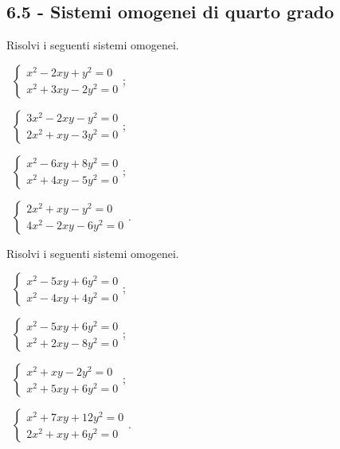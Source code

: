 \subsection*{6.5 - Sistemi omogenei di quarto grado}

\begin{esercizio}[\Ast]
 \label{ese:6.48}
Risolvi i seguenti sistemi omogenei.
\begin{multicols}{2}
 \begin{enumeratea}
 \item~$\left\{\begin{array}{l}x^2-2xy+y^2=0\\x^2+3xy-2y^2=0\end{array}\right.$;
 \item~$\left\{\begin{array}{l}3x^2-2xy-y^2=0\\2x^2+xy-3y^2=0\end{array}\right.$;
 \item~$\left\{\begin{array}{l}x^2-6{xy}+8y^2=0 \\x^2+4{xy}-5y^2=0 \end{array}\right.$;
 \item~$\left\{\begin{array}{l}2x^2+xy-y^2=0\\4x^2-2xy-6y^2=0\end{array}\right.$.
 \end{enumeratea}
\end{multicols}
\end{esercizio}

\begin{esercizio}[\Ast]
\label{ese:6.49}
Risolvi i seguenti sistemi omogenei.
\begin{multicols}{2}
 \begin{enumeratea}
 \item~$\left\{\begin{array}{l}x^2-5xy+6y^2=0\\x^2-4xy+4y^2=0\end{array}\right.$;
 \item~$\left\{\begin{array}{l}x^2-5xy+6y^2=0\\x^2+2xy-8y^2=0\end{array}\right.$;
 \item~$\left\{\begin{array}{l}x^2+xy-2y^2=0\\x^2+5xy+6y^2=0\end{array}\right.$;
 \item~$\left\{\begin{array}{l}x^2+7xy+12y^2=0\\2x^2+xy+6y^2=0\end{array}\right.$.
 \end{enumeratea}
\end{multicols}
\end{esercizio}

